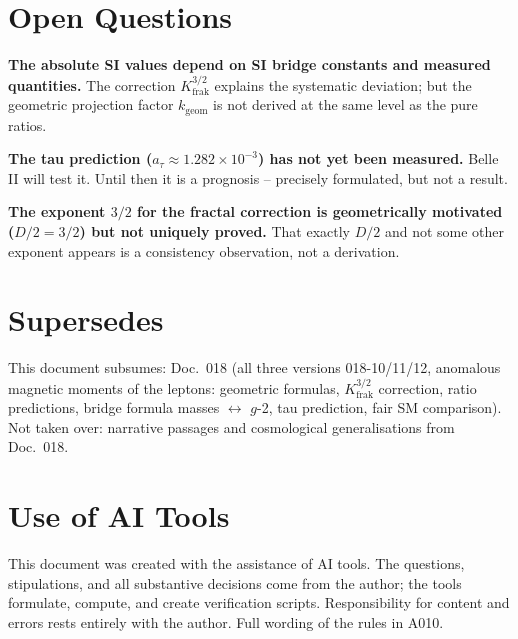 \section{Open Questions}

\textbf{The absolute SI values depend on SI bridge constants and measured
quantities.} The correction $K_\text{frak}^{3/2}$ explains the systematic
deviation; but the geometric projection factor $k_\text{geom}$ is not derived
at the same level as the pure ratios.

\textbf{The tau prediction ($a_\tau\approx1{.}282\times10^{-3}$) has not yet
been measured.} Belle II will test it. Until then it is a prognosis --
precisely formulated, but not a result.

\textbf{The exponent $3/2$ for the fractal correction is geometrically motivated
($D/2=3/2$) but not uniquely proved.} That exactly $D/2$ and not some other
exponent appears is a consistency observation, not a derivation.

\section{Supersedes}

This document subsumes: Doc.~018 (all three versions 018-10/11/12, anomalous
magnetic moments of the leptons: geometric formulas, $K_\text{frak}^{3/2}$
correction, ratio predictions, bridge formula masses $\leftrightarrow$ $g$-2,
tau prediction, fair SM comparison). Not taken over: narrative passages and
cosmological generalisations from Doc.~018.

\section{Use of AI Tools}

This document was created with the assistance of AI tools. The questions,
stipulations, and all substantive decisions come from the author; the tools
formulate, compute, and create verification scripts.
Responsibility for content and errors rests entirely with the author.
Full wording of the rules in A010.
